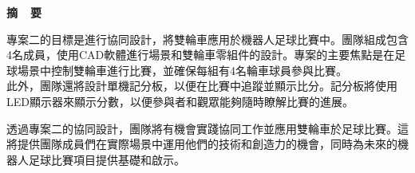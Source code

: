\renewcommand{\baselinestretch}{1.5} %
\clearpage  %
\sectionef
{} %
\begin{center}
\LARGE\textbf{摘~~要}\\
\end{center}
\begin{flushleft}
\fontsize{14pt}{20pt}\sectionef\hspace{12pt}\quad 專案二的目標是進行協同設計，將雙輪車應用於機器人足球比賽中。團隊組成包含4名成員，使用CAD軟體進行場景和雙輪車零組件的設計。專案的主要焦點是在足球場景中控制雙輪車進行比賽，並確保每組有4名輪車球員參與比賽。\\[12pt]

\fontsize{14pt}{20pt}\sectionef\hspace{12pt}\quad 此外，團隊還將設計單機記分板，以便在比賽中追蹤並顯示比分。記分板將使用LED顯示器來顯示分數，以便參與者和觀眾能夠隨時瞭解比賽的進展。\\[12pt]

\end{flushleft}
\begin{center}
\fontsize{14pt}{20pt}\selectfont 透過專案二的協同設計，團隊將有機會實踐協同工作並應用雙輪車於足球比賽。這將提供團隊成員們在實際場景中運用他們的技術和創造力的機會，同時為未來的機器人足球比賽項目提供基礎和啟示。
\end{center}
\newpage
